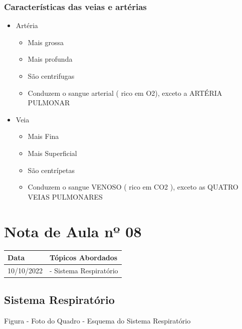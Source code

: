 \documentclass[
]{book}
\providecommand{\tightlist}{%
  \setlength{\itemsep}{0pt}\setlength{\parskip}{0pt}}
\begin{document}
\hypertarget{caracteruxedsticas-das-veias-e-artuxe9rias}{%
\subsubsection{Características das veias e artérias}\label{caracteruxedsticas-das-veias-e-artuxe9rias}}

\begin{itemize}
\tightlist
\item
  Artéria

  \begin{itemize}
  \tightlist
  \item
    Mais grossa
  \item
    Mais profunda
  \item
    São centrifugas
  \item
    Conduzem o sangue arterial ( rico em O2), exceto a ARTÉRIA PULMONAR
  \end{itemize}
\item
  Veia

  \begin{itemize}
  \tightlist
  \item
    Mais Fina
  \item
    Mais Superficial
  \item
    São centrípetas
  \item
    Conduzem o sangue VENOSO ( rico em CO2 ), exceto as QUATRO VEIAS PULMONARES
  \end{itemize}
\end{itemize}

\hypertarget{nota-de-aula-nuxba-08}{%
\section{Nota de Aula nº 08}\label{nota-de-aula-nuxba-08}}

\begin{longtable}[]{@{}ll@{}}
\toprule()
Data & Tópicos Abordados \\
\midrule()
\endhead
10/10/2022 & - Sistema Respiratório \\
\bottomrule()
\end{longtable}

\hypertarget{sistema-respiratuxf3rio}{%
\subsection{Sistema Respiratório}\label{sistema-respiratuxf3rio}}

Figura - Foto do Quadro - Esquema do Sistema Respiratório
\end{document}
